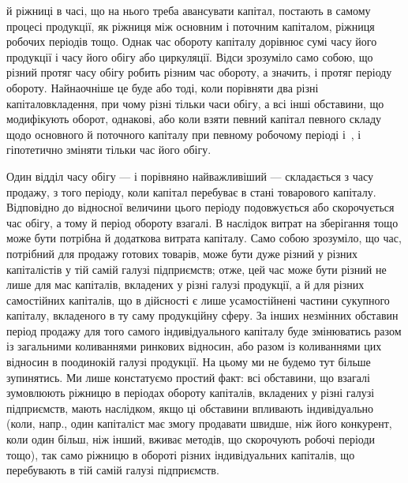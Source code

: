 \parcont{}  %
й ріжниці в часі, що на нього треба авансувати капітал, постають в самому процесі
продукції, як ріжниця між основним і поточним капіталом, ріжниця
робочих періодів тощо. Однак час обороту капіталу дорівнює сумі часу
його продукції і часу його обігу або циркуляції. Відси зрозуміло само
собою, що різний протяг часу обігу робить різним час обороту, а значить,
і протяг періоду обороту. Найнаочніше це буде або тоді, коли
порівняти два різні капіталовкладення, при чому різні тільки часи обігу,
а всі інші обставини, що модифікують оборот, однакові, або коли взяти
певний капітал певного складу щодо основного й поточного капіталу при
певному робочому періоді і~, і гіпотетично зміняти тільки час
його обігу.

Один відділ часу обігу — і порівняно найважливіший — складається з
часу продажу, з того періоду, коли капітал перебуває в стані товарового
капіталу. Відповідно до відносної величини цього періоду подовжується
або скорочується час обігу, а тому й період обороту взагалі. В наслідок
витрат на зберігання тощо може бути потрібна й додаткова витрата капіталу.
Само собою зрозуміло, що час, потрібний для продажу готових
товарів, може бути дуже різний у різних капіталістів у тій самій галузі
підприємств; отже, цей час може бути різний не лише для мас капіталів,
вкладених у різні галузі продукції, а й для різних самостійних капіталів,
що в дійсності є лише усамостійнені частини сукупного капіталу, вкладеного
в ту саму продукційну сферу. За інших незмінних обставин період
продажу для того самого індивідуального капіталу буде змінюватись
разом із загальними коливаннями ринкових відносин, або разом із
коливаннями цих відносин в поодинокій галузі продукції. На цьому ми
не будемо тут більше зупинятись. Ми лише констатуємо простий факт:
всі обставини, що взагалі зумовлюють ріжницю в періодах обороту капіталів,
вкладених у різні галузі підприємств, мають наслідком, якщо ці
обставини впливають індивідуально (коли, напр., один капіталіст має змогу
продавати швидше, ніж його конкурент, коли один більш, ніж інший,
вживає методів, що скорочують робочі періоди тощо), так само ріжницю
в обороті різних індивідуальних капіталів, що перебувають в тій самій
галузі підприємств.

